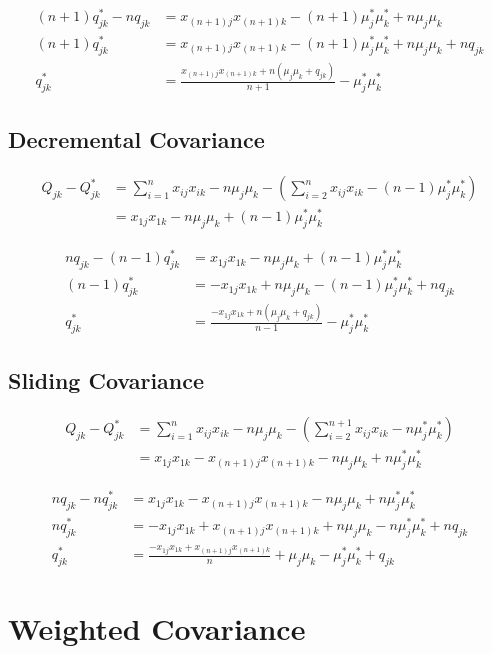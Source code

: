 \documentclass[english,12pt]{article}
\theoremstyle{plain}
\theoremstyle{definition}
\theoremstyle{definition} %
\newcommand{\brac}[1]{\left(#1\right)} %
\begin{document}
\begin{align*}
(n+1)q_{jk}^\ast - nq_{jk} &= x_{(n+1)j}x_{(n+1)k} - (n+1)\mu_j^\ast\mu_k^\ast + n\mu_j\mu_k\\
(n+1)q_{jk}^\ast  &= x_{(n+1)j}x_{(n+1)k} - (n+1)\mu_j^\ast\mu_k^\ast + n\mu_j\mu_k + nq_{jk}\\
q_{jk}^\ast  &= \frac{x_{(n+1)j}x_{(n+1)k} + n(\mu_j\mu_k + q_{jk})}{n+1} - \mu_j^\ast\mu_k^\ast
\end{align*}

\subsection{Decremental Covariance}
\begin{align*}
Q_{jk} - Q_{jk}^\ast &= \sum_{i=1}^{n}x_{ij}x_{ik} - n\mu_j\mu_k - \brac{\sum_{i=2}^nx_{ij}x_{ik} - (n-1)\mu_j^\ast\mu_k^\ast}\\
&=x_{1j}x_{1k} - n\mu_j\mu_k + (n-1)\mu_j^\ast\mu_k^\ast
\end{align*}

\begin{align*}
nq_{jk} - (n-1)q_{jk}^\ast &= x_{1j}x_{1k} - n\mu_j\mu_k + (n-1)\mu_j^\ast\mu_k^\ast\\
(n-1)q_{jk}^\ast &= -x_{1j}x_{1k} + n\mu_j\mu_k - (n-1)\mu_j^\ast\mu_k^\ast + nq_{jk}\\
q_{jk}^\ast &= \frac{-x_{1j}x_{1k} + n(\mu_j\mu_k + q_{jk})}{n-1} - \mu_j^\ast\mu_k^\ast
\end{align*}

\subsection{Sliding Covariance}
\begin{align*}
Q_{jk} - Q_{jk}^\ast &= \sum_{i=1}^{n}x_{ij}x_{ik} - n\mu_j\mu_k - \brac{\sum_{i=2}^{n+1}x_{ij}x_{ik} - n\mu_j^\ast\mu_k^\ast}\\
&=x_{1j}x_{1k} - x_{(n+1)j}x_{(n+1)k} - n\mu_j\mu_k + n\mu_j^\ast\mu_k^\ast
\end{align*}

\begin{align*}
nq_{jk} - nq_{jk}^\ast &= x_{1j}x_{1k} - x_{(n+1)j}x_{(n+1)k} - n\mu_j\mu_k + n\mu_j^\ast\mu_k^\ast\\
nq_{jk}^\ast &= -x_{1j}x_{1k} + x_{(n+1)j}x_{(n+1)k} + n\mu_j\mu_k - n\mu_j^\ast\mu_k^\ast + nq_{jk}\\
q_{jk}^\ast &= \frac{-x_{1j}x_{1k} + x_{(n+1)j}x_{(n+1)k}}{n} + \mu_j\mu_k - \mu_j^\ast\mu_k^\ast + q_{jk}
\end{align*}

\section{Weighted Covariance}
\end{document}
